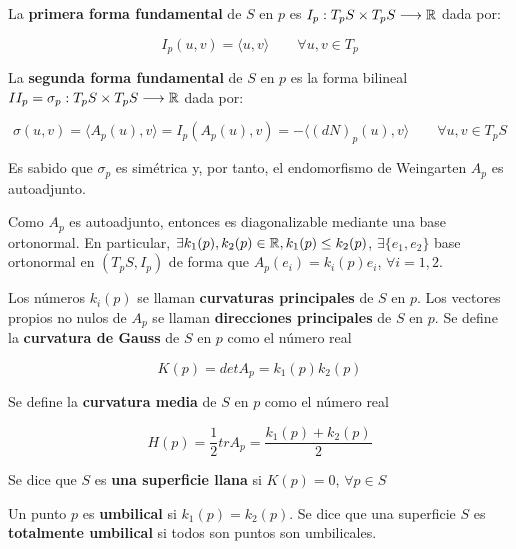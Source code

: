 \begin{definition}
La \textbf{primera forma fundamental} de $S$ en $p$ es $I_p: T_pS \times T_pS \longrightarrow \mathbb{R}$ dada por: 

\begin{equation*}
    I_p(u,v) =  \langle u,v \rangle \qquad \forall u,v \in T_p
\end{equation*}

La \textbf{segunda forma fundamental} de $S$ en $p$ es la forma bilineal $II_p = \sigma_p: T_pS \times T_pS \longrightarrow \mathbb{R}$ dada por: 

\begin{equation*}
    \sigma(u,v) = \langle A_p(u),v \rangle  = I_p(A_p(u),v) = - \langle (dN)_p(u), v \rangle \qquad \forall u,v \in T_pS
\end{equation*}

\end{definition}

Es sabido que $\sigma_p$ es simétrica y, por tanto, el endomorfismo de Weingarten $A_p$ es autoadjunto.

Como $A_p$ es autoadjunto, entonces es diagonalizable mediante una base ortonormal. En particular, $\exists k_1(p), k_2(p) \in \mathbb{R}, k_1(p) \leq k_2(p)$, $\exists \{e_1,e_2\}$ base ortonormal en $(T_pS, I_p)$ de forma que $A_p(e_i) = k_i(p)e_i$, $\forall i = 1,2$.

Los números $k_i(p)$ se llaman \textbf{curvaturas principales} de $S$ en $p$.
Los vectores propios no nulos de $A_p$ se llaman \textbf{direcciones principales} de $S$ en $p$.
Se define la \textbf{curvatura de Gauss} de $S$ en $p$ como el número real 

\begin{equation*}
    K(p)=det A_p=k_1(p)k_2(p)
\end{equation*}

Se define la \textbf{curvatura media} de $S$ en $p$ como el número real 

\begin{equation*}
    H(p)=\frac{1}{2}tr A_p=\frac{k_1(p)+k_2(p)}{2}
\end{equation*}

Se dice que $S$ es \textbf{una superficie llana} si $K(p)=0$, $\forall p \in S$

\begin{definition}
Un punto $p$ es \textbf{umbilical} si $k_1(p)=k_2(p)$.
Se dice que una superficie $S$ es \textbf{totalmente umbilical} si todos son puntos son umbilicales.
\end{definition}

